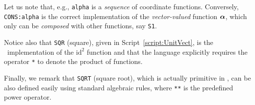 \documentclass{31x47jw}
\begin{document}
Let us note that, e.g., \texttt{alpha} is a \emph{sequence} of
coordinate functions.  Conversely, \texttt{CONS:alpha} is the correct
implementation of the \emph{vector-valued} function ${\mbox{\boldmath $\alpha$}}$,
which only can be \emph{composed} with other functions, say
\texttt{S1}.

Notice also that \texttt{SQR} (square), given in
Script~\ref{script:UnitVect}, is the \pl\ implementation of the
$\mbox{id}^{2}$ function and that the language explicitly requires the
operator \texttt{*} to denote the product of functions.

Finally, we remark that \texttt{SQRT} (square root), which is actually
primitive in \pl, can be also defined easily using standard algebraic
rules, where \texttt{**} is the predefined power operator.

    
\end{document}
